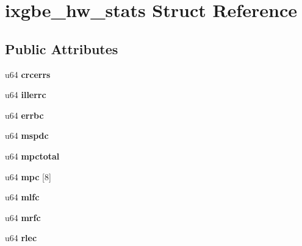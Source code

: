 \hypertarget{structixgbe__hw__stats}{
\section{ixgbe\_\-hw\_\-stats Struct Reference}
\label{structixgbe__hw__stats}
}
\subsection*{Public Attributes}
\begin{DoxyCompactItemize}
\item 
\hypertarget{structixgbe__hw__stats_aba838a9044561e1d369ea59dec6f125f}{
u64 {\bfseries crcerrs}}
\label{structixgbe__hw__stats_aba838a9044561e1d369ea59dec6f125f}

\item 
\hypertarget{structixgbe__hw__stats_ab8574a8acccc78b1dfb57d96d9e027f6}{
u64 {\bfseries illerrc}}
\label{structixgbe__hw__stats_ab8574a8acccc78b1dfb57d96d9e027f6}

\item 
\hypertarget{structixgbe__hw__stats_ab19023ede88d4caa20564f32bac27080}{
u64 {\bfseries errbc}}
\label{structixgbe__hw__stats_ab19023ede88d4caa20564f32bac27080}

\item 
\hypertarget{structixgbe__hw__stats_a91d3293b463ade424ef74cff3766bf05}{
u64 {\bfseries mspdc}}
\label{structixgbe__hw__stats_a91d3293b463ade424ef74cff3766bf05}

\item 
\hypertarget{structixgbe__hw__stats_a4caae2b8e8722850265bc927a312bbd8}{
u64 {\bfseries mpctotal}}
\label{structixgbe__hw__stats_a4caae2b8e8722850265bc927a312bbd8}

\item 
\hypertarget{structixgbe__hw__stats_a4cce36fec0c541700de5dcf9e65b730e}{
u64 {\bfseries mpc} \mbox{[}8\mbox{]}}
\label{structixgbe__hw__stats_a4cce36fec0c541700de5dcf9e65b730e}

\item 
\hypertarget{structixgbe__hw__stats_a744b53747e8f4cc1fe1c431fd5f85810}{
u64 {\bfseries mlfc}}
\label{structixgbe__hw__stats_a744b53747e8f4cc1fe1c431fd5f85810}

\item 
\hypertarget{structixgbe__hw__stats_a1050405671ff5617a63af4a697d10c5f}{
u64 {\bfseries mrfc}}
\label{structixgbe__hw__stats_a1050405671ff5617a63af4a697d10c5f}

\item 
\hypertarget{structixgbe__hw__stats_a2f930b59e21864027e1588eb9dc05a7d}{
u64 {\bfseries rlec}}
\label{structixgbe__hw__stats_a2f930b59e21864027e1588eb9dc05a7d}


\end{DoxyCompactItemize}
